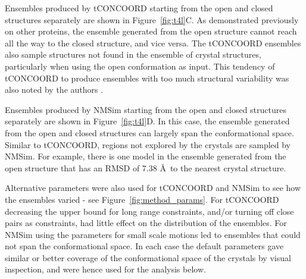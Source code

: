Ensembles produced by tCONCOORD starting from the open and closed structures separately are shown in Figure~\ref{fig:t4l}C.
As demonstrated previously on other proteins, the ensemble generated from the open structure cannot reach all the way to the closed structure, and vice versa.
The tCONCOORD ensembles also sample structures not found in the ensemble of crystal structures, particularly when using the open conformation as input.
This tendency of tCONCOORD to produce ensembles with too much structural variability was also noted by the authors \cite{Seeliger2009}.

Ensembles produced by NMSim starting from the open and closed structures separately are shown in Figure~\ref{fig:t4l}D.
In this case, the ensemble generated from the open and closed structures can largely span the conformational space.
Similar to tCONCOORD, regions not explored by the crystals are sampled by NMSim.
For example, there is one model in the ensemble generated from the open structure that has an RMSD of 7.38 \AA\ to the nearest crystal structure.

Alternative parameters were also used for tCONCOORD and NMSim to see how the ensembles varied - see Figure~\ref{fig:method_params}.
For tCONCOORD decreasing the upper bound for long range constraints, and/or turning off close pairs as constraints, had little effect on the distribution of the ensembles.
For NMSim using the parameters for small scale motions led to ensembles that could not span the conformational space.
In each case the default parameters gave similar or better coverage of the conformational space of the crystals by visual inspection, and were hence used for the analysis below.


